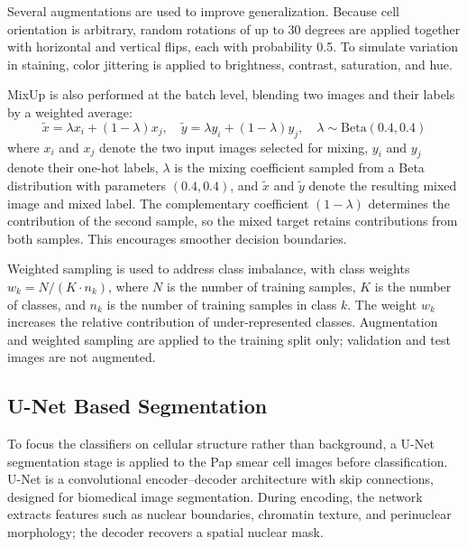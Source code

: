 \documentclass[runningheads]{llncs}
\begin{document}
Several augmentations are used to improve generalization. Because cell orientation is arbitrary, random rotations of up to 30 degrees are applied together with horizontal and vertical flips, each with probability 0.5. To simulate variation in staining, color jittering is applied to brightness, contrast, saturation, and hue.

MixUp \cite{zhang2018mixup} is also performed at the batch level, blending two images and their labels by a weighted average:
\begin{equation}
    \tilde{x}=\lambda x_i+(1{-}\lambda)x_j,\quad
    \tilde{y}=\lambda y_i+(1{-}\lambda)y_j,\quad
    \lambda\sim\mathrm{Beta}(0.4,0.4)
    \label{eq:mixup}
\end{equation}
where $x_i$ and $x_j$ denote the two input images selected for mixing, $y_i$ and $y_j$ denote their one-hot labels, $\lambda$ is the mixing coefficient sampled from a Beta distribution with parameters $(0.4,0.4)$, and $\tilde{x}$ and $\tilde{y}$ denote the resulting mixed image and mixed label. The complementary coefficient $(1-\lambda)$ determines the contribution of the second sample, so the mixed target retains contributions from both samples. This encourages smoother decision boundaries.

Weighted sampling is used to address class imbalance, with class weights $w_k = N/(K\cdot n_k)$, where $N$ is the number of training samples, $K$ is the number of classes, and $n_k$ is the number of training samples in class $k$. The weight $w_k$ increases the relative contribution of under-represented classes. Augmentation and weighted sampling are applied to the training split only; validation and test images are not augmented.

\subsection{U-Net Based Segmentation}
\label{sec:unet}

To focus the classifiers on cellular structure rather than background, a U-Net \cite{ronneberger2015unet} segmentation stage is applied to the Pap smear cell images before classification. U-Net is a convolutional encoder--decoder architecture with skip connections, designed for biomedical image segmentation. During encoding, the network extracts features such as nuclear boundaries, chromatin texture, and perinuclear morphology; the decoder recovers a spatial nuclear mask.
\end{document}
